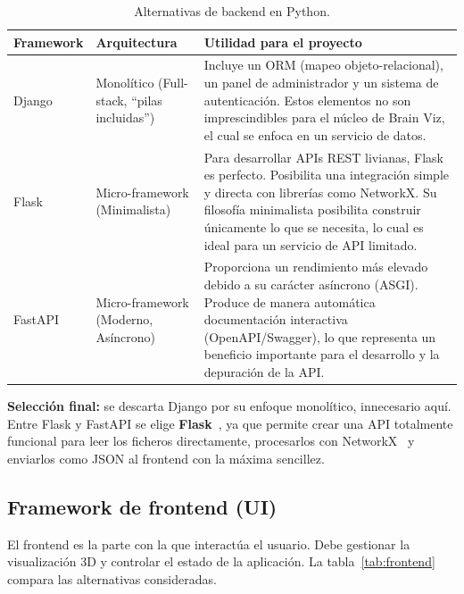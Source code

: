 \begin{table}[H]
	\centering
	\caption{Alternativas de backend en Python.}
	\label{tab:backend}
	\small
	\begin{tabularx}{\textwidth}{>{\raggedright\arraybackslash}p{2.0cm} >{\raggedright\arraybackslash}p{3.1cm} >{\raggedright\arraybackslash}X}
		\toprule
		\textbf{Framework} & \textbf{Arquitectura} & \textbf{Utilidad para el proyecto} \\
		\midrule
		Django & Monolítico (Full-stack, ``pilas incluidas'') &
			Incluye un ORM (mapeo objeto-relacional), un panel de administrador y un sistema de
			autenticación. Estos elementos no son imprescindibles para el núcleo de Brain Viz, el cual
			se enfoca en un servicio de datos. \\
		\addlinespace
		Flask & Micro-framework (Minimalista) &
			Para desarrollar APIs REST livianas, Flask es perfecto. Posibilita una integración simple y
			directa con librerías como NetworkX. Su filosofía minimalista posibilita construir
			únicamente lo que se necesita, lo cual es ideal para un servicio de API limitado. \\
		\addlinespace
		FastAPI & Micro-framework (Moderno, Asíncrono) &
			Proporciona un rendimiento más elevado debido a su carácter asíncrono (ASGI). Produce de
			manera automática documentación interactiva (OpenAPI/Swagger), lo que representa un beneficio
			importante para el desarrollo y la depuración de la API. \\
		\bottomrule
	\end{tabularx}
\end{table}

\textbf{Selección final:} se descarta Django por su enfoque monolítico, innecesario aquí. Entre Flask
y FastAPI se elige \textbf{Flask}~\cite{flask}, ya que permite crear una API totalmente funcional para
leer los ficheros directamente, procesarlos con NetworkX~\cite{networkx} y enviarlos como JSON al
frontend con la máxima sencillez.

\subsection{Framework de frontend (UI)}

El frontend es la parte con la que interactúa el usuario. Debe gestionar la visualización 3D y
controlar el estado de la aplicación. La tabla~\ref{tab:frontend} compara las alternativas
consideradas.

